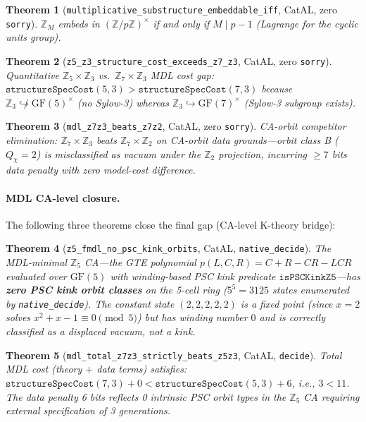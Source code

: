 \documentclass[11pt,a4paper]{article}
\newtheorem{theorem}{Theorem}[section]
\theoremstyle{definition}
\begin{document}
\begin{theorem}[\lstinline|multiplicative_substructure_embeddable_iff|, CatAL, zero \texttt{sorry}]
$\mathbb{Z}_M$ embeds in $(\mathbb{Z}/p\mathbb{Z})^\times$ if and only if $M \mid p-1$
(Lagrange for the cyclic units group).
\end{theorem}

\begin{theorem}[\lstinline|z5_z3_structure_cost_exceeds_z7_z3|, CatAL, zero \texttt{sorry}]
Quantitative $\mathbb{Z}_5\times\mathbb{Z}_3$ vs.\ $\mathbb{Z}_7\times\mathbb{Z}_3$
MDL cost gap: $\mathtt{structureSpecCost}(5,3) > \mathtt{structureSpecCost}(7,3)$
because $\mathbb{Z}_3 \not\hookrightarrow \mathrm{GF}(5)^\times$ (no Sylow-3) whereas
$\mathbb{Z}_3 \hookrightarrow \mathrm{GF}(7)^\times$ (Sylow-3 subgroup exists).
\end{theorem}

\begin{theorem}[\lstinline|mdl_z7z3_beats_z7z2|, CatAL, zero \texttt{sorry}]
CA-orbit competitor elimination:
$\mathbb{Z}_7\times\mathbb{Z}_3$ beats $\mathbb{Z}_7\times\mathbb{Z}_2$ on
CA-orbit data grounds---orbit class B ($Q_\chi=2$) is misclassified as vacuum
under the $\mathbb{Z}_2$ projection, incurring $\geq 7$ bits data penalty with
zero model-cost difference.
\end{theorem}

\paragraph{MDL CA-level closure.}
The following three theorems close the final gap (CA-level K-theory bridge):

\begin{theorem}[\lstinline|z5_fmdl_no_psc_kink_orbits|, CatAL, \lstinline|native_decide|]
The MDL-minimal $\mathbb{Z}_5$ CA---the GTE polynomial $p(L,C,R)=C+R-CR-LCR$
evaluated over $\mathrm{GF}(5)$ with winding-based PSC kink predicate
$\mathtt{isPSCKinkZ5}$---has \textbf{zero PSC kink orbit classes} on the 5-cell
ring ($5^5=3125$ states enumerated by \lstinline|native_decide|).
The constant state $(2,2,2,2,2)$ is a fixed point (since $x=2$ solves $x^2+x-1\equiv0\pmod5$)
but has winding number $0$ and is correctly classified as a displaced vacuum, not a kink.
\end{theorem}

\begin{theorem}[\lstinline|mdl_total_z7z3_strictly_beats_z5z3|, CatAL, \lstinline|decide|]
Total MDL cost (theory $+$ data terms) satisfies:
$\mathtt{structureSpecCost}(7,3)+0 < \mathtt{structureSpecCost}(5,3)+6$,
i.e., $3 < 11$. The data penalty 6 bits reflects 0 intrinsic PSC orbit types
in the $\mathbb{Z}_5$ CA requiring external specification of 3 generations.
\end{theorem}
\end{document}
